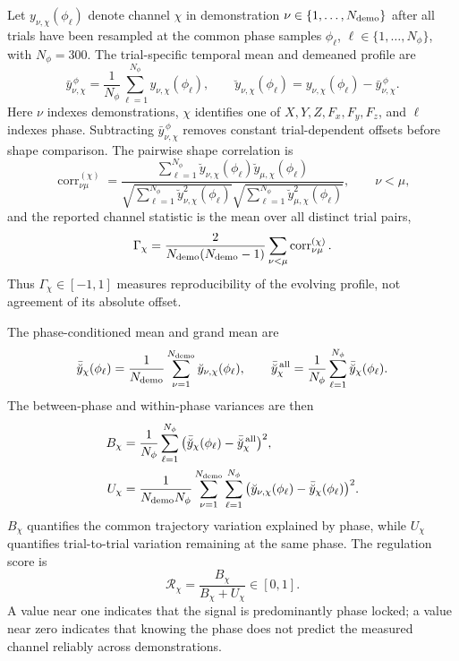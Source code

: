 \documentclass[11pt,a4paper]{article}
\begin{document}
Let $y_{\nu,\chi}(\phi_\ell)$ denote channel $\chi$ in demonstration
$\nu\in\{1,\ldots,N_{\rm demo}\}$ after all trials have been resampled at the
common phase samples
$\phi_\ell$, $\ell\in\{1,\ldots,N_\phi\}$, with $N_\phi=300$. The
trial-specific temporal mean and demeaned profile are
\begin{equation}
\bar y_{\nu,\chi}^{\,\phi}
=\frac{1}{N_\phi}\sum_{\ell=1}^{N_\phi}y_{\nu,\chi}(\phi_\ell),
\qquad
\breve y_{\nu,\chi}(\phi_\ell)
=y_{\nu,\chi}(\phi_\ell)-\bar y_{\nu,\chi}^{\,\phi}.
\label{eq:demo_demean}
\end{equation}
Here $\nu$ indexes demonstrations, $\chi$ identifies one of
$X,Y,Z,F_x,F_y,F_z$, and $\ell$ indexes phase. Subtracting
$\bar y_{\nu,\chi}^{\,\phi}$ removes constant trial-dependent offsets before
shape comparison. The pairwise shape correlation is
\begin{equation}
\operatorname{corr}_{\nu\mu}^{(\chi)}
=\frac{\displaystyle
\sum_{\ell=1}^{N_\phi}
\breve y_{\nu,\chi}(\phi_\ell)\breve y_{\mu,\chi}(\phi_\ell)}
{\displaystyle
\sqrt{\sum_{\ell=1}^{N_\phi}\breve y_{\nu,\chi}^2(\phi_\ell)}
\sqrt{\sum_{\ell=1}^{N_\phi}\breve y_{\mu,\chi}^2(\phi_\ell)}} ,
\qquad \nu<\mu ,
\label{eq:pair_shape_correlation}
\end{equation}
and the reported channel statistic is the mean over all distinct trial pairs,
\begin{equation}
\Gamma_\chi
=\frac{2}{N_{\rm demo}(N_{\rm demo}-1)}
\sum_{\nu<\mu}\operatorname{corr}_{\nu\mu}^{(\chi)} .
\label{eq:mean_shape_correlation}
\end{equation}
Thus $\Gamma_\chi\in[-1,1]$ measures reproducibility of the evolving profile,
not agreement of its absolute offset.

The phase-conditioned mean and grand mean are
\begin{equation}
\bar{\breve y}_{\chi}(\phi_\ell)
=\frac{1}{N_{\rm demo}}\sum_{\nu=1}^{N_{\rm demo}}
\breve y_{\nu,\chi}(\phi_\ell),
\qquad
\bar{\breve y}_{\chi}^{\,\rm all}
=\frac{1}{N_\phi}\sum_{\ell=1}^{N_\phi}\bar{\breve y}_{\chi}(\phi_\ell).
\label{eq:phase_means}
\end{equation}
The between-phase and within-phase variances are then
\begin{align}
B_\chi
&=\frac{1}{N_\phi}\sum_{\ell=1}^{N_\phi}
\big(\bar{\breve y}_{\chi}(\phi_\ell)
-\bar{\breve y}_{\chi}^{\,\rm all}\big)^2,
\label{eq:between_phase_variance}\\
U_\chi
&=\frac{1}{N_{\rm demo}N_\phi}
\sum_{\nu=1}^{N_{\rm demo}}\sum_{\ell=1}^{N_\phi}
\big(\breve y_{\nu,\chi}(\phi_\ell)
-\bar{\breve y}_{\chi}(\phi_\ell)\big)^2 .
\label{eq:within_phase_variance}
\end{align}
$B_\chi$ quantifies the common trajectory variation explained by phase, while
$U_\chi$ quantifies trial-to-trial variation remaining at the same phase. The
regulation score is
\begin{equation}
\mathcal R_\chi=\frac{B_\chi}{B_\chi+U_\chi}\in[0,1].
\label{eq:regulation_score}
\end{equation}
A value near one indicates that the signal is predominantly phase locked; a
value near zero indicates that knowing the phase does not predict the measured
channel reliably across demonstrations.
\end{document}
